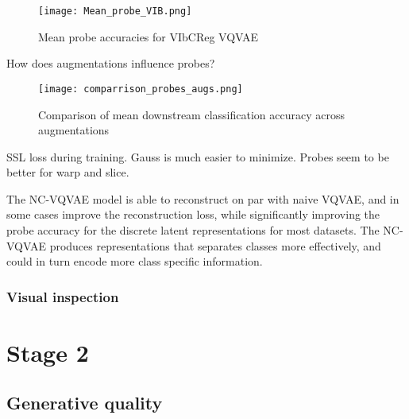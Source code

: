\documentclass[../../thesis.tex]{subfiles}
\begin{document}
\begin{figure}[H]
    \label{fig:Mean_probe_VIB}
    \texttt{[image: Mean\_probe\_VIB.png]}
    \centering  
    \caption{Mean probe accuracies for VIbCReg VQVAE}
\end{figure}

How does augmentations influence probes? 
\begin{figure}[H]
    \label{fig:comparrison_probes_augs}
    \texttt{[image: comparrison\_probes\_augs.png]}
    \centering  
    \caption{Comparison of mean downstream classification accuracy across augmentations}
\end{figure}



SSL loss during training. Gauss is much easier to minimize. Probes seem to be better for warp and slice.\newline 

The NC-VQVAE model is able to reconstruct on par with naive VQVAE, and in some cases improve the reconstruction loss, while significantly improving the probe accuracy for the discrete latent representations for most datasets. The NC-VQVAE produces representations that separates classes more effectively, and could in turn encode more class specific information.



\subsubsection{Visual inspection}






\section{Stage 2}

\subsection{Generative quality}
\end{document}
